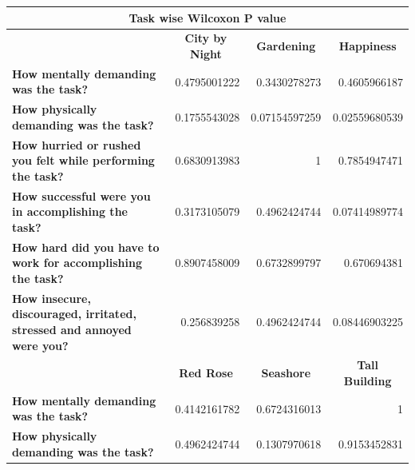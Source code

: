 \documentclass[english]{tktltiki}
\begin{document}
\begin{table}
	
	\begin{center}
    \begin{tabular}{|p{6cm}|r|r|r|}
        \hline
        \multicolumn{4}{|c|}{\textbf{Task wise Wilcoxon P value}} \\
        \hline
        
        
        
        \multicolumn{1}{|c|}{} & \multicolumn{1}{|c|}{\textbf{City by Night}} & \multicolumn{1}{|c|}{\textbf{Gardening}} & \multicolumn{1}{|c|}{\textbf{Happiness}} \\
        \hline
        
        \textbf{How mentally demanding was the task?} & 0.4795001222 & 0.3430278273 & 0.4605966187 \\
        \hline
        
        \textbf{How physically demanding was the task?} & 0.1755543028 & 0.07154597259 & 0.02559680539 \\
        \hline
        
        \textbf{How hurried or rushed you felt while performing the task?} & 0.6830913983 & 1 & 0.7854947471 \\
        \hline
        
        \textbf{How successful were you in accomplishing the task?} & 0.3173105079 & 0.4962424744 & 0.07414989774 \\
        \hline
        
        \textbf{How hard did you have to work for accomplishing the task?} & 0.8907458009 & 0.6732899797 & 0.670694381 \\
        \hline
        
        \textbf{How insecure, discouraged, irritated, stressed and annoyed were you?} & 0.256839258 & 0.4962424744 & 0.08446903225 \\
        \hline
        \hline
        
        \multicolumn{1}{|c|}{} & \multicolumn{1}{|c|}{\textbf{Red Rose}} & \multicolumn{1}{|c|}{\textbf{Seashore}} & \multicolumn{1}{|c|}{\textbf{Tall Building}} \\
        \hline
		
		\textbf{How mentally demanding was the task?} & 0.4142161782 & 0.6724316013 & 1 \\
        \hline
        
        \textbf{How physically demanding was the task?} & 0.4962424744 & 0.1307970618 & 0.9153452831 \\
        \hline
        

\end{tabular}
\end{center}
\end{table}
\end{document}
